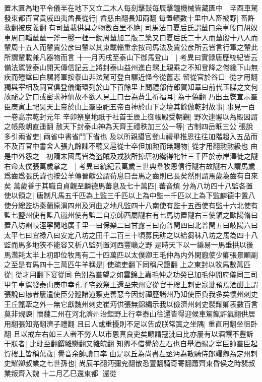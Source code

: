 置木匱為地平令儀半在地下又立二木人每刻擊鼔每辰擊鐘機械皆藏匱中　辛酉車駕發東都百官貴戚四夷酋長從行|{
	酋慈由翻長知兩翻}
每置頓數十里中人畜被野|{
	畜許救翻被皮義翻}
有司輦載供具之物數百里不絶|{
	司馬法曰夏后氏謂輦曰余車殷曰胡奴車周曰輜輦輦一斧一鑿一梩一鋤周輦加二版二築又曰夏后氏二十人而輦殷十八人而輦周十五人而輦賈公彦曰輦以其束載輜重余按司馬法及賈公彦所云皆言行軍之輦此所謂輦載兼凡器物而言}
十一月丙戌至泰山下御馬登山　|{
	考異曰實録唐歷統紀皆云備法駕登泰山開天傳信記云上將封泰山益州進白騾上親乘之不知登降之倦纔下山無疾而殪諡曰白騾將軍按泰山非法駕可登白騾近怪今從舊志}
留從官於谷口|{
	從才用翻}
獨與宰相及祠官俱登儀衛環列於山下百餘里上問禮部侍郎賀知章曰前代玉牒之文何故祕之對曰或密求神仙故不欲人見上曰吾為蒼生祈福耳|{
	為于偽翻}
乃出玉牒宣示羣臣庚寅上祀昊天上帝於山上羣臣祀五帝百神於山下之壇其餘倣乾封故事|{
	事見一百一卷高宗乾封元年}
辛卯祭皇地祇于社首壬辰上御帳殿受朝覲|{
	野次連幄以為殿因謂之帳殿朝直遥翻}
赦天下封泰山神為天齊王禮秩加三公一等|{
	古制四岳眡三公}
張說多引兩省吏|{
	兩省中書省門下省也}
及以所親攝官登山禮畢推恩往往加階超入五品而不及百官中書舍人張九齡諫不聽又扈從士卒但加勲而無賜物|{
	從才用翻勲勲級也}
由是中外怨之　初隋末國馬皆為盗賊及戎狄所掠唐初纔得牝牡三千匹於赤岸澤徙之隴右命太僕張萬歲掌之　|{
	考異曰統紀云萬歲三世典羣牧恩信行隴右故隴右人謂馬歲爲齒爲張氏諱也按公羊傳晉獻公謂荀息曰吾馬之齒則已長矣然則謂馬歲為齒有自來矣}
萬歲善于其職自貞觀至麟德馬蕃息及七十萬匹|{
	蕃音煩}
分為八坊四十八監各置使以領之|{
	唐制凡馬五千匹為上監三千匹以上為中監一千匹以上為下監麟德中置八使分總監坊秦蘭原渭四州及河曲之地凡監四十八南使有監十五西使有監十六北使有監七鹽州使有監八嵐州使有監二自京師西屬隴右有七馬坊置隴右三使領之歐陽脩曰置八坊豳岐涇寜間地廣千里一曰保樂二曰甘露三曰南普閏四曰北普閏五曰岐陽六曰太平七曰宜禄八曰安定八坊之田千二百三十頃募民耕之以給芻秣八坊之馬為四十八監而馬多地狹不能容又析八監列置河西豐曠之野}
是時天下以一縑易一馬垂拱以後馬濳耗太半上初即位牧馬有二十四萬匹以太僕卿王毛仲為内外閑廐使少卿張景順副之至是有馬四十三萬匹牛羊稱是|{
	使疏吏翻下同稱尺證翻}
上之東封以牧馬數萬匹從|{
	從才用翻下宴從同}
色别為羣望之如雲錦上嘉毛仲之功癸巳加毛仲開府儀同三司甲午車駕發泰山庚申幸孔子宅致祭上還至宋州宴從官于樓上刺史寇泚預焉酒酣上謂張說曰曏者屢遣使臣分廵諸道察吏善惡今因封禪歷諸州乃知使臣負我多矣懷州刺史王丘餼牽之外一無它獻魏州刺史崔沔供張無錦繡示我以儉濟州刺史裴耀卿表數百言莫非規諫|{
	懷魏二州在河北濟州治鉅野上行幸泰山往還皆得迎候車駕餼許氣翻供居用翻張知亮翻濟子禮翻}
且曰人或重擾則不足以告成朕常寘之坐隅|{
	重直用翻坐徂卧翻}
且以戒左右如三人者不勞人以市恩真良吏矣顧謂寇泚曰比亦屢有以酒饌不豐訴于朕者|{
	比毗至翻饌雛戀翻又雛皖翻}
知卿不借譽於左右也自舉酒賜之宰臣帥羣臣起賀樓上皆稱萬歲|{
	譽音余帥讀曰率}
由是以丘為尚書左丞沔為散騎侍郎耀卿為定州刺史耀卿叔業之七世孫也|{
	尚辰羊翻沔彌兖翻散悉亶翻騎奇寄翻蕭齊東昏侯之時裴叔業叛齊入魏}
十二月乙巳還東都|{
	還從}


